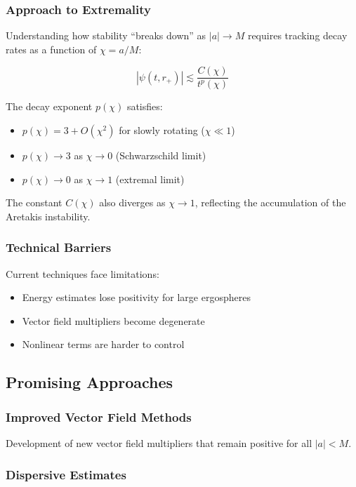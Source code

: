 \documentclass[12pt,a4paper]{article}
\begin{document}
\subsubsection{Approach to Extremality}

Understanding how stability ``breaks down'' as $|a| \to M$ requires tracking decay rates as a function of $\chi = a/M$:

\begin{equation}
|\psi(t, r_+)| \lesssim \frac{C(\chi)}{t^p(\chi)}
\end{equation}

The decay exponent $p(\chi)$ satisfies:
\begin{itemize}
    \item $p(\chi) = 3 + O(\chi^2)$ for slowly rotating ($\chi \ll 1$)
    \item $p(\chi) \to 3$ as $\chi \to 0$ (Schwarzschild limit)
    \item $p(\chi) \to 0$ as $\chi \to 1$ (extremal limit)
\end{itemize}

The constant $C(\chi)$ also diverges as $\chi \to 1$, reflecting the accumulation of the Aretakis instability.

\subsubsection{Technical Barriers}

Current techniques face limitations:
\begin{itemize}
    \item Energy estimates lose positivity for large ergospheres
    \item Vector field multipliers become degenerate
    \item Nonlinear terms are harder to control
\end{itemize}

\subsection{Promising Approaches}

\subsubsection{Improved Vector Field Methods}

Development of new vector field multipliers that remain positive for all $|a| < M$.

\subsubsection{Dispersive Estimates}
\end{document}
